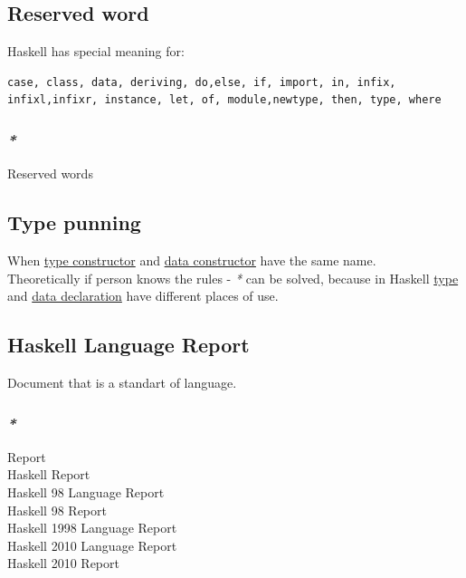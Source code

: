 \documentclass[11pt]{article}
\begin{document}
\subsection{\label{org945c274}Reserved word}
\label{sec:orge4c5382}
Haskell has special meaning for:\\
\begin{verbatim}
case, class, data, deriving, do,else, if, import, in, infix, infixl,infixr, instance, let, of, module,newtype, then, type, where
\end{verbatim}

\subsubsection{\emph{*}}
\label{sec:org236a8c5}
\label{orgb440041}Reserved words\\

\subsection{\label{org56c5cbc}Type punning}
\label{sec:org9ff6667}
When \hyperref[org385fa30]{type constructor} and \hyperref[org1fbdcfd]{data constructor} have the same name.\\

Theoretically if person knows the rules - \emph{*} can be solved, because in Haskell \hyperref[orgc4aea2f]{type} and \hyperref[org5326432]{data declaration} have different places of use.\\

\subsection{\label{org410ae24}Haskell Language Report}
\label{sec:org556a470}
Document that is a standart of language.\\

\subsubsection{\emph{*}}
\label{sec:orga56f299}
\label{orgd71543b}Report\\
\label{org8cd3af4}Haskell Report\\
\label{org18721ed}Haskell 98 Language Report\\
\label{orgb3c1d28}Haskell 98 Report\\
\label{org8c68e40}Haskell 1998 Language Report\\
\label{org4a8554a}Haskell 2010 Language Report\\
\label{org15b61f6}Haskell 2010 Report\\
\end{document}

